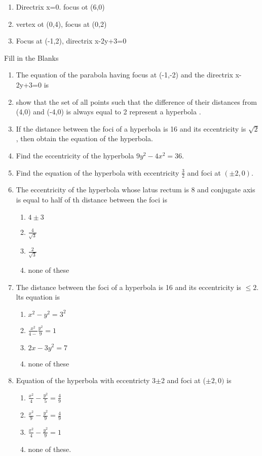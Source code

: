 \begin{enumerate}[label=\thesection.\arabic*,ref=\thesection.\theenumi,resume*]
\item  Directrix x=0. focus ot (6,0)
\item  vertex  ot (0,4), focus at (0,2)
\item  Focus at (-1,2), directrix x-2y+3=0
\end{enumerate}
Fill in the Blanks
\begin{enumerate}[label=\thesection.\arabic*,ref=\thesection.\theenumi,resume*]
\item The equation of the parabola having focus at (-1,-2) and the directrix x-2y+3=0 is \makebox[1cm]{\hrulefill}   
\item show that the set of all points such that the difference of their distances from (4,0) and (-4,0) is always equal to 2 represent a hyperbola .
\item If the distance between the foci of a hyperbola is 16 and its eccentricity is $\sqrt{2}$, then obtain the equation of the hyperbola.
\item Find the eccentricity of the hyperbola $9y^2-4x^2=36$.
\item Find the equation of the hyperbola with eccentricity $\frac{3}{2}$ and foci at $(\pm2,0)$.
\item The eccentricity of the hyperbola whose latus rectum is 8 and conjugate axis is equal to half of th distance between the foci is 
\begin{enumerate}
\item $4\pm3$
\item $\frac{4}{\sqrt{3}}$
\item $\frac{2}{\sqrt{3}}$
\item none of these
\end{enumerate}
\item The distance between the foci of a hyperbola is 16 and its eccentricity is $\le{2}$. lts equation is
\begin{enumerate}
\item $x^2-y^2=3^2$
\item $\frac{x^2}{4-}\frac{y^2}{9}=1$
\item $2x-3y^2=7$
 \item none of these
 \end{enumerate}
 \item Equation of the hyperbola with eccentricty 3$\pm$2 and foci at ($\pm2,0)$ is
\begin{enumerate} 
	\item $\frac{x^2}{4}-\frac{y^2}{5}=\frac{4}{9}$

	\item  $\frac{x^2}{9}-\frac{y^2}{9}=\frac{4}{9}$
	\item  $\frac{x^2}{4}-\frac{y^2}{9}=1$
\item  none of these.
\end{enumerate}
\end{enumerate}
